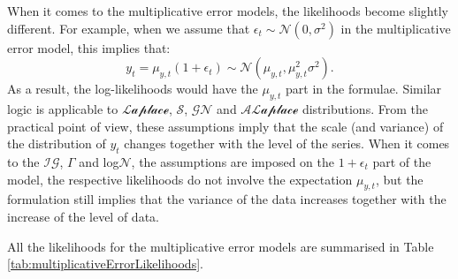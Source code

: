 \documentclass[
]{book}
\theoremstyle{definition}
\theoremstyle{definition}
\theoremstyle{definition}
\theoremstyle{definition}
\theoremstyle{remark}
\begin{document}
When it comes to the multiplicative error models, the likelihoods become slightly different. For example, when we assume that \(\epsilon_t \sim \mathcal{N}(0, \sigma^2)\) in the multiplicative error model, this implies that:
\begin{equation}
    y_t = \mu_{y,t}(1+\epsilon_t) \sim \mathcal{N}(\mu_{y,t}, \mu_{y,t}^2 \sigma^2) .
  \label{eq:ETSADAMNormalDistributionExample03}
\end{equation}
As a result, the log-likelihoods would have the \(\mu_{y,t}\) part in the formulae. Similar logic is applicable to \(\mathcal{Laplace}\), \(\mathcal{S}\), \(\mathcal{GN}\) and \(\mathcal{ALaplace}\) distributions. From the practical point of view, these assumptions imply that the scale (and variance) of the distribution of \(y_t\) changes together with the level of the series. When it comes to the \(\mathcal{IG}\), \(\Gamma\) and log\(\mathcal{N}\), the assumptions are imposed on the \(1+\epsilon_t\) part of the model, the respective likelihoods do not involve the expectation \(\mu_{y,t}\), but the formulation still implies that the variance of the data increases together with the increase of the level of data.

All the likelihoods for the multiplicative error models are summarised in Table \ref{tab:multiplicativeErrorLikelihoods}.
\end{document}
